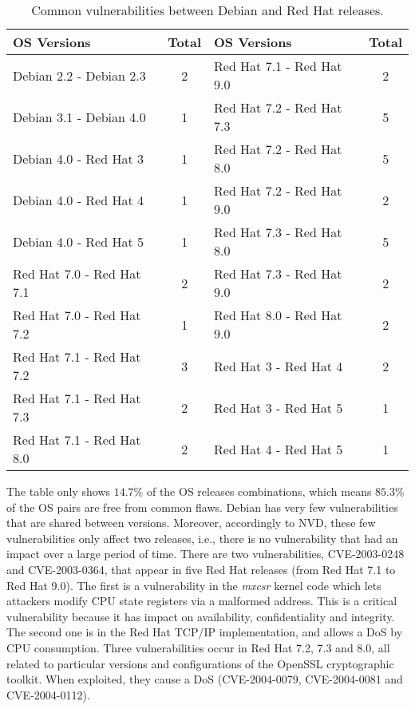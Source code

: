 \begin{table}[!ht]
\caption{Common vulnerabilities between Debian and Red Hat releases.}
\label{tab:debian_RedHat}
\begin{center}
{\scriptsize
\begin{tabular}{|l|c||l|c|}\hline
\textbf{OS Versions} & Total &  \textbf{OS Versions} & Total \\\hline\hline
Debian 2.2 - Debian 2.3 & 2 & Red Hat 7.1 - Red Hat 9.0 & 2  \\\hline
Debian 3.1 - Debian 4.0 & 1 & Red Hat 7.2 - Red Hat 7.3 & 5  \\\hline
Debian 4.0 - Red Hat 3 & 1 &  Red Hat 7.2 - Red Hat 8.0 & 5  \\\hline
Debian 4.0 - Red Hat 4 & 1 & Red Hat 7.2 - Red Hat 9.0 & 2  \\\hline
Debian 4.0 - Red Hat 5 & 1 & Red Hat 7.3 - Red Hat 8.0 & 5  \\\hline
Red Hat 7.0 - Red Hat 7.1 & 2 & Red Hat 7.3 - Red Hat 9.0 & 2  \\\hline
Red Hat 7.0 - Red Hat 7.2 & 1 & Red Hat 8.0 - Red Hat 9.0 & 2  \\\hline
Red Hat 7.1 - Red Hat 7.2 & 3 &  Red Hat 3 - Red Hat 4 & 2  \\\hline
Red Hat 7.1 - Red Hat 7.3 & 2 & Red Hat 3 - Red Hat 5 & 1  \\\hline
Red Hat 7.1 - Red Hat 8.0 & 2 &  Red Hat 4 - Red Hat 5 & 1  \\\hline
\end{tabular}
}
\end{center}
\end{table}

The table only shows $14.7\%$ of the OS releases combinations, which means $85.3\%$ of the OS pairs are free from common flaws. Debian has very few vulnerabilities that are shared between versions. Moreover, accordingly to NVD, these few vulnerabilities only affect two releases, i.e., there is no vulnerability that had an impact over a large period of time. There are two vulnerabilities, CVE-2003-0248 and CVE-2003-0364, that appear in five Red Hat releases (from Red Hat 7.1 to Red Hat 9.0). The first is a vulnerability in the \emph{mxcsr} kernel code which lets attackers modify CPU state registers via a malformed address. This is a critical vulnerability because it has impact on availability, confidentiality and integrity. The second one is in the Red Hat TCP/IP implementation, and allows a DoS by CPU consumption. Three vulnerabilities occur in Red Hat 7.2, 7.3 and 8.0, all related to particular versions and configurations of the OpenSSL cryptographic toolkit. When exploited, they cause a DoS (CVE-2004-0079, CVE-2004-0081 and CVE-2004-0112).

